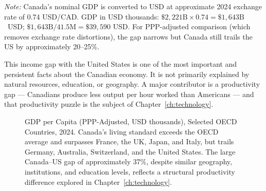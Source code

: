 \noindent\textit{Note:} Canada's nominal GDP is converted to USD at
approximate 2024 exchange rate of 0.74 USD/CAD. GDP in USD thousands:
\(\$2{,}221\text{B} \times 0.74 = \$1{,}643\text{B}\)\ USD; \(\$1{,}643\text{B} / 41.5\text{M} = \$39{,}590\) USD. For PPP-adjusted comparison (which removes exchange rate distortions), the gap narrows but Canada still trails the US by approximately 20--25\%.

This income gap with the United States is one of the most important and
persistent facts about the Canadian economy. It is not primarily explained
by natural resources, education, or geography. A major contributor is
a productivity gap --- Canadians produce less output per hour worked than
Americans --- and that productivity puzzle is the subject of
Chapter~\ref{ch:technology}.

\begin{figure}[H]
\centering
{}
\caption{GDP per Capita (PPP-Adjusted, USD thousands), Selected OECD Countries, 2024.
Canada's living standard exceeds the OECD average and surpasses France, the UK,
Japan, and Italy, but trails Germany, Australia, Switzerland, and the United
States. The large Canada--US gap of approximately 37\%, despite similar geography,
institutions, and education levels, reflects a structural productivity difference
explored in Chapter~\ref{ch:technology}.}
\label{fig:gdp_per_capita}
\end{figure}

